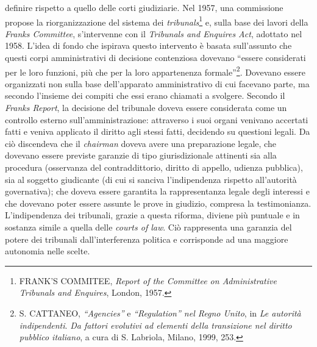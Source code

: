 \documentclass[12pt,it,a4paper,]{report}
\begin{document}
definire rispetto a quello delle corti giudiziarie. Nel 1957, una
commissione propose la riorganizzazione del sistema dei
\emph{tribunals}\footnote{FRANK'S COMMITEE, \emph{Report of the
  Committee on Administrative Tribunals and Enquires}, London, 1957.} e,
sulla base dei lavori della \emph{Franks Committee}, s'intervenne con il
\emph{Tribunals and Enquires Act}, adottato nel 1958. L'idea di fondo
che ispirava questo intervento è basata sull'assunto che questi corpi
amministrativi di decisione contenziosa dovevano ``essere considerati
per le loro funzioni, più che per la loro appartenenza
formale''\footnote{S. CATTANEO, \emph{``Agencies''} e
  \emph{``Regulation'' nel Regno Unito}, in \emph{Le autorità
  indipendenti}. \emph{Da fattori evolutivi ad elementi della
  transizione nel diritto pubblico italiano}, a cura di S. Labriola,
  Milano, 1999, 253.}. Dovevano essere organizzati non sulla base
dell'apparato amministrativo di cui facevano parte, ma secondo l'insieme
dei compiti che essi erano chiamati a svolgere. Secondo il \emph{Franks
Report}, la decisione del tribunale doveva essere considerata come un
controllo esterno sull'amministrazione: attraverso i suoi organi
venivano accertati fatti e veniva applicato il diritto agli stessi
fatti, decidendo su questioni legali. Da ciò discendeva che il
\emph{chairman} doveva avere una preparazione legale, che dovevano
essere previste garanzie di tipo giurisdizionale attinenti sia alla
procedura (osservanza del contraddittorio, diritto di appello, udienza
pubblica), sia al soggetto giudicante (di cui si sanciva l'indipendenza
rispetto all'autorità governativa); che doveva essere garantita la
rappresentanza legale degli interessi e che dovevano poter essere
assunte le prove in giudizio, compresa la testimonianza. L'indipendenza
dei tribunali, grazie a questa riforma, diviene più puntuale e in
sostanza simile a quella delle \emph{courts of law}. Ciò rappresenta una
garanzia del potere dei tribunali dall'interferenza politica e
corrisponde ad una maggiore autonomia nelle scelte.
\end{document}
